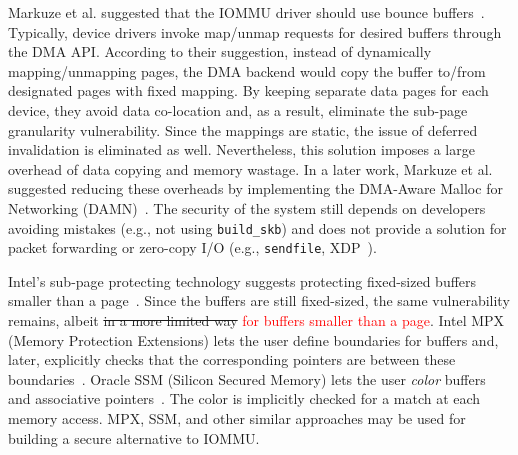 Markuze et al. suggested that the IOMMU driver should use bounce buffers~\cite{MMT16}. Typically, device drivers invoke map/unmap requests for desired buffers through the DMA API. According to their suggestion, instead of dynamically mapping/unmapping pages, the DMA backend would copy the buffer to/from designated pages with fixed mapping. By keeping separate data pages for each device, they avoid data co-location and, as a result, eliminate the sub-page granularity vulnerability. Since the mappings are static, the issue of deferred invalidation is eliminated as well. 
%
Nevertheless, this solution imposes a large overhead of data copying and memory wastage. In a later work, Markuze et al. suggested reducing these overheads by implementing the DMA-Aware Malloc for Networking (DAMN)~\cite{MSMT18}. The security of the system still depends on developers avoiding mistakes (e.g., not using \texttt{build\_skb}) and does not provide a solution for packet forwarding or zero-copy I/O (e.g., \texttt{sendfile}, XDP~\cite{xdp}). %

Intel’s sub-page protecting technology suggests protecting fixed-sized buffers smaller than a page~\cite{Int18}. Since the buffers are still fixed-sized, the same vulnerability remains, albeit \sout{in a more limited way} \textcolor{red}{for buffers smaller than a page}. Intel MPX (Memory Protection Extensions) lets the user define boundaries for buffers and, later, explicitly checks that the corresponding pointers are between these boundaries~\cite{Int16a}. Oracle SSM (Silicon Secured Memory) lets the user \emph{color} buffers and associative pointers~\cite{Ora15}. The color is implicitly checked for a match at each memory access. MPX, SSM, and other similar approaches may be used for building a secure alternative to IOMMU. 

